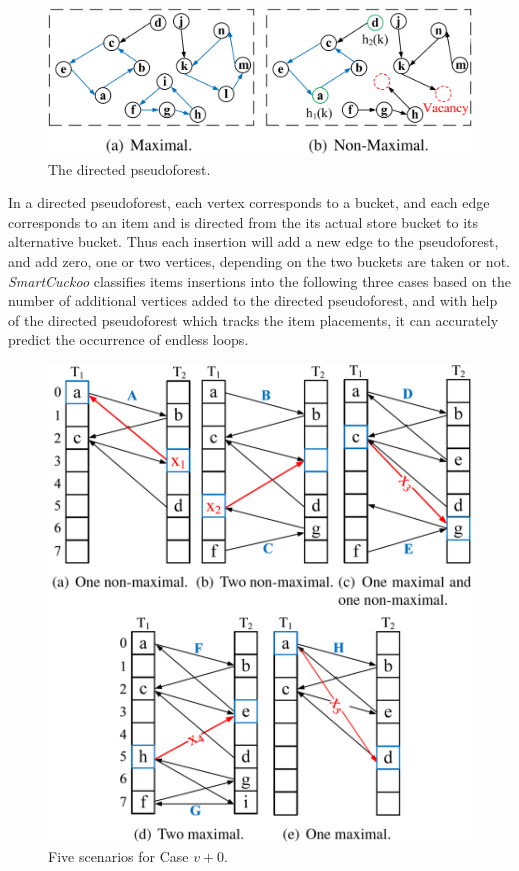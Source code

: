 \documentclass[12pt,conference,compsoc]{IEEEtran}
\begin{document}
\begin{figure}
    \centering
    \includegraphics[width=\linewidth]{maximal-graph.png}
    \caption{The directed pseudoforest.} \label{fig:maximal-graph}
\end{figure}

In a directed pseudoforest, each vertex corresponds to a bucket, and each edge corresponds to an item and is directed from the its actual store bucket to its alternative bucket. Thus each insertion will add a new edge to the pseudoforest, and add zero, one or two vertices, depending on the two buckets are taken or not.  \textit{SmartCuckoo} classifies items insertions into the following three cases based on the number of additional vertices added to the directed pseudoforest, and with help of the directed pseudoforest which tracks the item placements, it can accurately predict the occurrence of endless loops.

\begin{figure}
    \centering
    \includegraphics[width=\linewidth]{v+0.png}
    \caption{Five scenarios for Case $v+0$.} \label{fig:v+0}
\end{figure}
\end{document}
